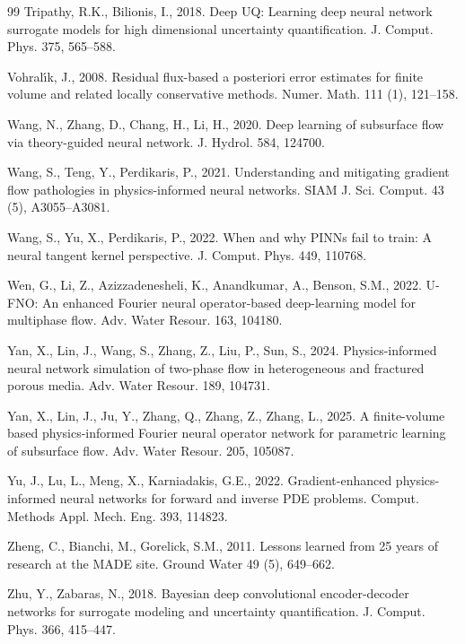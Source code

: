 \documentclass[preprint,12pt,authoryear]{elsarticle}
\begin{document}
\begin{thebibliography}{99}
Tripathy, R.K., Bilionis, I., 2018. Deep UQ: Learning deep neural network surrogate models for high dimensional uncertainty quantification. J. Comput. Phys. 375, 565--588.

Vohral\'{\i}k, J., 2008. Residual flux-based a posteriori error estimates for finite volume and related locally conservative methods. Numer. Math. 111 (1), 121--158.

Wang, N., Zhang, D., Chang, H., Li, H., 2020. Deep learning of subsurface flow via theory-guided neural network. J. Hydrol. 584, 124700.

Wang, S., Teng, Y., Perdikaris, P., 2021. Understanding and mitigating gradient flow pathologies in physics-informed neural networks. SIAM J. Sci. Comput. 43 (5), A3055--A3081.

Wang, S., Yu, X., Perdikaris, P., 2022. When and why PINNs fail to train: A neural tangent kernel perspective. J. Comput. Phys. 449, 110768.

Wen, G., Li, Z., Azizzadenesheli, K., Anandkumar, A., Benson, S.M., 2022. U-FNO: An enhanced Fourier neural operator-based deep-learning model for multiphase flow. Adv. Water Resour. 163, 104180.

Yan, X., Lin, J., Wang, S., Zhang, Z., Liu, P., Sun, S., 2024. Physics-informed neural network simulation of two-phase flow in heterogeneous and fractured porous media. Adv. Water Resour. 189, 104731.

Yan, X., Lin, J., Ju, Y., Zhang, Q., Zhang, Z., Zhang, L., 2025. A finite-volume based physics-informed Fourier neural operator network for parametric learning of subsurface flow. Adv. Water Resour. 205, 105087.

Yu, J., Lu, L., Meng, X., Karniadakis, G.E., 2022. Gradient-enhanced physics-informed neural networks for forward and inverse PDE problems. Comput. Methods Appl. Mech. Eng. 393, 114823.

Zheng, C., Bianchi, M., Gorelick, S.M., 2011. Lessons learned from 25 years of research at the MADE site. Ground Water 49 (5), 649--662.

Zhu, Y., Zabaras, N., 2018. Bayesian deep convolutional encoder-decoder networks for surrogate modeling and uncertainty quantification. J. Comput. Phys. 366, 415--447.

\end{thebibliography}
\end{document}
